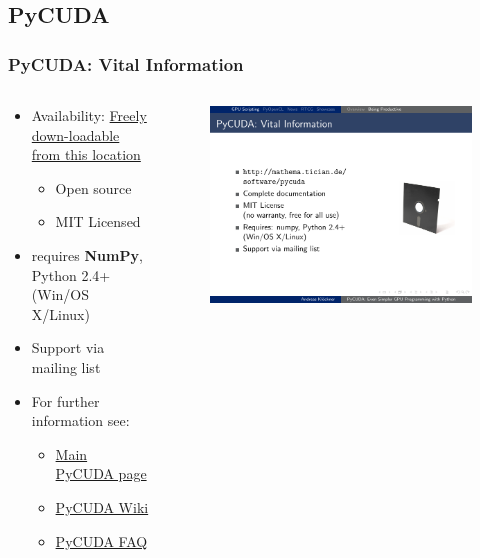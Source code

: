 \documentclass[]{beamer}
\begin{document}
\subsection{PyCUDA}
\begin{frame}
\frametitle{PyCUDA: Vital Information}
\begin{columns}
    \begin{column}{.65\textwidth}
        \begin{itemize}
            \item Availability: \href{https://pypi.python.org/pypi/pycuda}{Freely down-loadable from this location}
                \begin{itemize}
                    \item Open source
                    \item MIT Licensed  
                \end{itemize}  
            \item requires {\bf NumPy}, Python 2.4+ (Win/OS X/Linux)
            \item Support via mailing list
            \item For further information see:
                \begin{itemize}
                    \item \href{https://mathema.tician.de/software/pycuda/}{Main PyCUDA page}
                   \item \href{https://wiki.tiker.net/PyCuda}{PyCUDA Wiki}
                   \item \href{https://wiki.tiker.net/PyCuda/FrequentlyAskedQuestions}{PyCUDA FAQ}
                \end{itemize}
        \end{itemize}        
    \end{column}
    \begin{column}{.45\textwidth}
        \begin{figure}
            \begin{minipage}{0.65\textwidth}
                \includegraphics[width=1.1\textwidth]{pics/pycuda_vital}

\end{minipage}
\end{figure}
\end{column}
\end{columns}
\end{frame}
\end{document}

